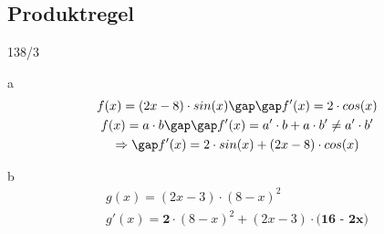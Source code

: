 \subsection{Produktregel}
\begin{exercise}{138/3}
  \item [a]
  \begin{gather*}
    f(x) = (2x - 8) \cdot sin(x) \gap\gap f'(x) = 2 \cdot cos(x) \\
    f(x) = a \cdot b \gap\gap f'(x) = a' \cdot b + a \cdot b' \neq a' \cdot b' \\
    \Rightarrow \gap f'(x) = 2 \cdot sin(x) + (2x - 8) \cdot cos(x)
  \end{gather*}
  \item [b]
  \begin{gather*}
    g(x) = (2x - 3) \cdot (8 - x)^2 \\
    g'(x) = \textbf{2} \cdot (8 - x)^2 + (2x - 3) \cdot \textbf{(16 - 2x)}
  \end{gather*}
\end{exercise}
